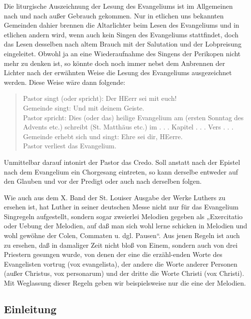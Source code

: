Die liturgische Auszeichnung der Lesung des Evangeliums ist im Allgemeinen nach und nach außer Gebrauch gekommen. Nur in etlichen uns bekannten Gemeinden dahier brennen die Altarlichter beim Lesen des Evangeliums und in etlichen andern wird, wenn auch kein Singen des Evangeliums stattfindet, doch das Lesen desselben nach altem Brauch mit der Salutation und der Lobpreisung eingeleitet. Obwohl ja an eine Wiederaufnahme des Singens der Perikopen nicht mehr zu denken ist, so könnte doch noch immer nebst dem Anbrennen der Lichter nach der erwähnten Weise die Lesung des Evangeliums ausgezeichnet werden. Diese Weise wäre dann folgende:

\begin{verse}
Pastor singt (oder spricht): Der HEerr sei mit euch!\\
Gemeinde singt: Und mit deinem Geiste.\\
Pastor spricht: Dies (oder das) heilige Evangelium am (ersten Sonntag des Advents etc.) schreibt (St. Matthäus etc.) im . . . Kapitel . . . Vers . . .\\
Gemeinde erhebt sich und singt: Ehre sei dir, HEerre.\\
Pastor verliest das Evangelium.
\end{verse}

Unmittelbar darauf intonirt der Pastor das Credo. Soll anstatt nach der Epistel nach dem Evangelium ein Chorgesang eintreten, so kann derselbe entweder auf den Glauben und vor der Predigt oder auch nach derselben folgen.

Wie auch aus dem X. Band der St. Louiser Ausgabe der Werke Luthers zu ersehen ist, hat Luther in seiner deutschen Messe nicht nur für das Evangelium Singregeln aufgestellt, sondern sogar zweierlei Melodien gegeben als „Exercitatio oder Uebung der Melodien, auf daß man sich wohl lerne schicken in Melodien und wohl gewöhne der Colen, Commaten u. dgl. Pausen“. Aus jenen Regeln ist auch zu ersehen, daß in damaliger Zeit nicht bloß von Einem, sondern auch von drei Priestern gesungen wurde, von denen der eine die erzähl-enden
Worte des Evangelisten vortrug (vox evangelista), der andere die Worte anderer Personen (außer Christus, vox personarum) und der dritte die Worte Christi (vox Christi). Mit Weglassung dieser Regeln geben wir beispielsweise nur die eine der Melodien.

\subsection{Einleitung}

